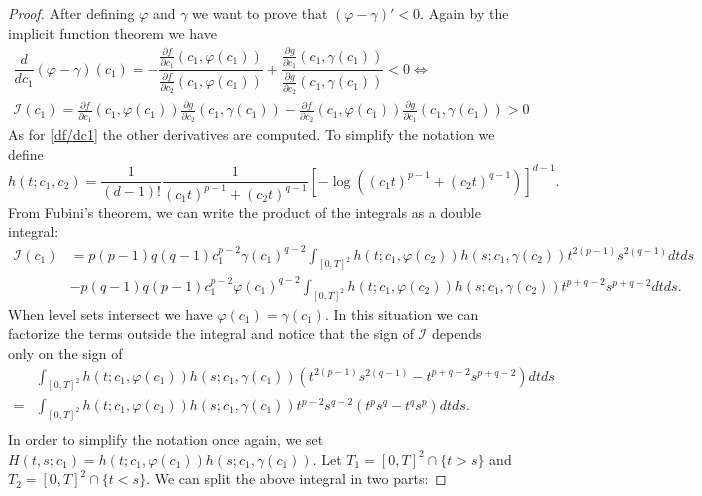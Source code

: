 \documentclass[corpo=11pt, stile=classica, tipotesi=custom,
greek, evenboxes, english]{toptesi}
\numberwithin{equation}{chapter}
\theoremstyle{definition}
\theoremstyle{remark}
\newcommand{\pfrac}[2]{\frac{\partial #1}{\partial #2}}
\begin{document}
\begin{proof}
After defining $\varphi$ and $\gamma$ we want to prove that $(\varphi-\gamma)' < 0$. Again by the implicit function theorem we have
\begin{equation*}
	\begin{split}
		\dfrac{d}{d c_1}(\varphi - \gamma)(c_1) = -\dfrac{\pfrac{f}{c_1}(c_1,\varphi(c_1))}{\pfrac{f}{c_2}(c_1,\varphi(c_1))}  + 
		\dfrac{\pfrac{g}{c_1}(c_1,\gamma(c_1))}{\pfrac{g}{c_2}(c_1,\gamma(c_1))} < 0 \iff \\
		\mathcal{I}(c_1) = \pfrac{f}{c_1}(c_1,\varphi(c_1)) \pfrac{g}{c_2}(c_1,\gamma(c_1)) - \pfrac{f}{c_2}(c_1,\varphi(c_1)) \pfrac{g}{c_1}(c_1,\gamma(c_1)) > 0
	\end{split}
\end{equation*}
As for \eqref{df/dc1} the other derivatives are computed. To simplify the notation we define 
\begin{equation*}
	h(t;c_1,c_2) = \frac{1}{(d-1)!}\frac{1}{(c_1t)^{p-1}+(c_2t)^{q-1}}\left[ -\log\left((c_1t)^{p-1} + (c_2t)^{q-1}\right) \right]^{d-1}.
\end{equation*}
From Fubini's theorem, we can write the product of the integrals as a double integral:
\begin{equation*}
	\begin{split}
		\mathcal{I}(c_1) &=p(p-1)q(q-1)c_1^{p-2}\gamma(c_1)^{q-2} \int_{[0,T]^2} h(t;c_1,\varphi(c_2)) h(s;c_1,\gamma(c_2)) t^{2(p-1)} s^{2(q-1)} dtds \\ &-p(q-1)q(p-1)c_1^{p-2}\varphi(c_1)^{q-2} \int_{[0,T]^2} h(t;c_1,\varphi(c_2)) h(s;c_1,\gamma(c_2)) t^{p+q-2} s^{p+q-2} dtds.
	\end{split}
\end{equation*}
When level sets intersect we have $\varphi(c_1)=\gamma(c_1)$. In this situation we can factorize the terms outside the integral and notice that the sign of $\mathcal{I}$ depends only on the sign of
\begin{equation*}
	\begin{split}
		&\int_{[0,T]^2} h(t;c_1,\varphi(c_1)) h(s;c_1,\gamma(c_1))\left( t^{2(p-1)} s^{2(q-1)} - t^{p+q-2} s^{p+q-2} \right)dtds \\
		=&\int_{[0,T]^2} h(t;c_1,\varphi(c_1)) h(s;c_1,\gamma(c_1)) t^{p-2}s^{q-2}\left( t^p s^q - t^q s^p \right)dtds.\\
	\end{split}
\end{equation*}
In order to simplify the notation once again, we set $H(t,s;c_1) = h(t;c_1,\varphi(c_1)) h(s;c_1,\gamma(c_1))$. Let $T_1 = [0,T]^2 \cap \{t>s\}$ and $T_2 = [0,T]^2 \cap \{t<s\}$. We can split the above integral in two parts:

\end{proof}
\end{document}
